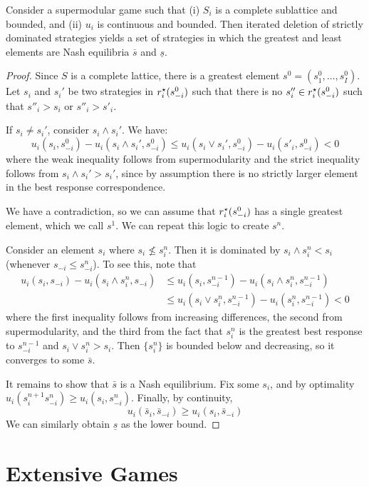 \documentclass[10pt]{article}
\begin{document}
\begin{theorem}
	Consider a supermodular game such that (i) $S_i$ is a complete sublattice and bounded, and (ii) $u_i$ is continuous and bounded. Then iterated deletion of strictly dominated strategies yields a set of strategies in which the greatest and least elements are Nash equilibria $\overline{s}$ and $\underline{s}$.
\end{theorem}
\begin{proof}
	Since $S$ is a complete lattice, there is a greatest element $s^0 = (s^0_1,\dots,s^0_I)$. Let $s_i$ and $s_i'$ be two strategies in $r^\star_i(s^0_{-i})$ such that there is no $s''_i \in r^\star_i(s^0_{-i})$ such that $s''_i > s_i$ or $s''_i > s'_i$.
	
	If $s_i \ne s_i'$, consider $s_i \wedge s_i'$. We have: \[u_i(s_i,s_{-i}^0) - u_i(s_i \wedge s_i', s_{-i}^0) \le u_i(s_i \vee s_i',s_{-i}^0) - u_i(s'_i,s_{-i}^0) < 0\]where the weak inequality follows from supermodularity and the strict inequality follows from $s_i \wedge s_i' > s_i'$, since by assumption there is no strictly larger element in the best response correspondence.
	
	We have a contradiction, so we can assume that $r^\star_i(s_{-i}^0)$ has a single greatest element, which we call $s^1$. We can repeat this logic to create $s^n$.
	
	Consider an element $s_i$ where $s_i \not\le s^n_i$. Then it is dominated by $s_i \wedge s_i^n < s_i$ (whenever $s_{-i} \le s^n_{-i}$). To see this, note that \begin{align*} u_i(s_i,s_{-i}) - u_i(s_i \wedge s_i^n,s_{-i}) &\le u_i(s_i,s_{-i}^{n-1}) - u_i(s_i \wedge s_i^n,s_{-i}^{n-1}) \\ &\le u_i(s_i \vee s_i^n,s_{-i}^{n-1}) - u_i(s_i^n ,s_{-i}^{n-1}) < 0\end{align*}where the first inequality follows from increasing differences, the second from supermodularity, and the third from the fact that $s_i^n$ is the greatest best response to $s_{-i}^{n-1}$ and $s_i \vee s_i^n > s_i$. Then $\{s_i^n\}$ is bounded below and decreasing, so it converges to some $\bar{s}$. 
	
	It remains to show that $\bar{s}$ is a Nash equilibrium. Fix some $s_i$, and by optimality $u_i(s_i^{n+1}s_{-i}^n) \ge u_i(s_i,s^n_{-i})$. Finally, by continuity, \[u_i(\bar{s}_i,\bar{s}_{-i}) \ge u_i(s_i,\bar{s}_{-i})\]We can similarly obtain $\underline{s}$ as the lower bound.
\end{proof}


\section{Extensive Games}
\end{document}
